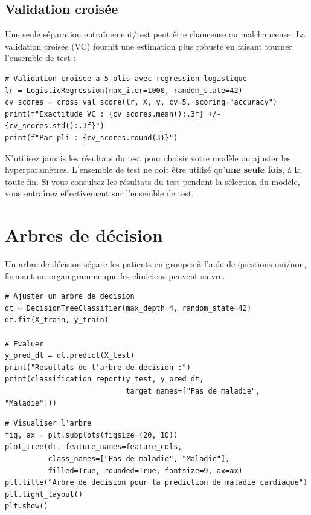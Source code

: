 \subsection{Validation crois\'ee}

Une seule s\'eparation entra\^inement/test peut \^etre chanceuse ou malchanceuse. La validation crois\'ee (VC) fournit une estimation plus robuste en faisant tourner l'ensemble de test :

\begin{verbatim}
# Validation croisee a 5 plis avec regression logistique
lr = LogisticRegression(max_iter=1000, random_state=42)
cv_scores = cross_val_score(lr, X, y, cv=5, scoring="accuracy")
print(f"Exactitude VC : {cv_scores.mean():.3f} +/- {cv_scores.std():.3f}")
print(f"Par pli : {cv_scores.round(3)}")
\end{verbatim}

\begin{warningbox}
N'utilisez jamais les r\'esultats du test pour choisir votre mod\`ele ou ajuster les hyperparam\`etres. L'ensemble de test ne doit \^etre utilis\'e qu'\textbf{une seule fois}, \`a la toute fin. Si vous consultez les r\'esultats du test pendant la s\'election du mod\`ele, vous entra\^inez effectivement sur l'ensemble de test.
\end{warningbox}

\section{Arbres de d\'ecision}

Un arbre de d\'ecision s\'epare les patients en groupes \`a l'aide de questions oui/non, formant un organigramme que les cliniciens peuvent suivre.

\begin{verbatim}
# Ajuster un arbre de decision
dt = DecisionTreeClassifier(max_depth=4, random_state=42)
dt.fit(X_train, y_train)

# Evaluer
y_pred_dt = dt.predict(X_test)
print("Resultats de l'arbre de decision :")
print(classification_report(y_test, y_pred_dt,
                            target_names=["Pas de maladie", "Maladie"]))
\end{verbatim}

\begin{verbatim}
# Visualiser l'arbre
fig, ax = plt.subplots(figsize=(20, 10))
plot_tree(dt, feature_names=feature_cols,
          class_names=["Pas de maladie", "Maladie"],
          filled=True, rounded=True, fontsize=9, ax=ax)
plt.title("Arbre de decision pour la prediction de maladie cardiaque")
plt.tight_layout()
plt.show()
\end{verbatim}

